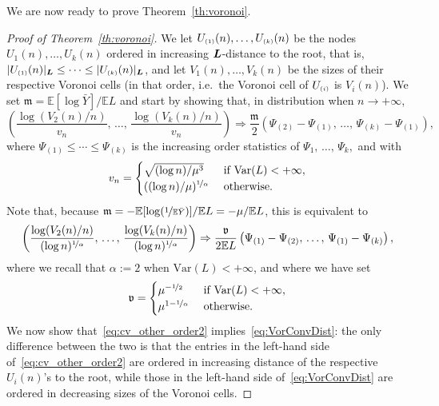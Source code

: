 \documentclass[AHL,Unicode,longabstracts,published]{cedram}
\newcommand{\bs}{\ensuremath{\boldsymbol}}
\newcommand{\sss}{\ensuremath{\scriptscriptstyle}}
\newcommand{\bbE}{\mathbb{E}}
\newcommand{\Var}{\mathrm{Var}}
\newcommand{\frkv}{\mathfrak{v}}
\newcommand{\frkm}{\mathfrak{m}}
\begin{document}
We are now ready to prove Theorem~\ref{th:voronoi}.
\begin{proof}[Proof of Theorem~\ref{th:voronoi}]
We let $U_{\sss (1)}(n), \ldots, U_{\sss (k)}(n)$ be the nodes $U_1(n), \ldots, U_k(n)$ ordered in increasing $\bs L$-distance to the root, that is, $|U_{\sss (1)}(n)|_{\bs L}\leq \cdots\leq |U_{\sss (k)}(n)|_{\bs L}$, and let $V_1(n), \ldots, V_k(n)$ be the sizes of their respective Voronoi cells (in that order, i.e.\ the Voronoi cell of $U_{\sss (i)}$ is $V_i(n)$). We set $\frkm = \bbE[\log \bar Y]/\bbE L$ and start by showing that, in distribution when $n\to+\infty$,
\begin{equation}\label{eq:cv_other_order}
\left(\frac{\log (V_2(n)/n)}{v_n},\,\ldots,\,\frac{\log (V_k(n)/n)}{v_n}\right)
\Rightarrow \frac{\frkm}{2} \left(\Psi_{(2)}-\Psi_{(1)}, \,\ldots,\, \Psi_{(k)}-\Psi_{(1)}\right),
\end{equation}
where $\Psi_{(1)}\leq \cdots\leq \Psi_{(k)}$ is the increasing order statistics of $\Psi_1, \,\ldots,\, \Psi_k,$ and with
\begin{equation}\label{eq:def_vn}
v_n =
\begin{cases}
\sqrt{(\log n)/\mu^3} &\text{ if }\Var(L)<+\infty,\\
((\log n)/\mu)^{\nicefrac1\alpha}&\text{ otherwise}.
\end{cases}
\end{equation}
Note that, because $\frkm = -\bbE[\log(\nicefrac1{\bbE\bar Y})]/\bbE L = -\mu/\bbE L$, this is equivalent to
\begin{equation}\label{eq:cv_other_order2}
\left(\frac{\log (V_2(n)/n)}{(\log n)^{\nicefrac1\alpha}}, \,\ldots,\,\frac{\log (V_k(n)/n)}{(\log n)^{\nicefrac1\alpha}}\right)
\Rightarrow \frac{\frkv}{2\bbE L} \left(\Psi_{(1)}-\Psi_{(2)}, \,\ldots,\, \Psi_{(1)}-\Psi_{(k)}\right),
\end{equation}
where we recall that $\alpha :=2$ when $\Var(L)<+\infty$, and where we have set
\[
\frkv =
\begin{cases}
\mu^{-\nicefrac12} & \text{ if }\Var(L)<+\infty,\\
\mu^{1-\nicefrac1\alpha} &\text{ otherwise.}
\end{cases}
\]
We now show that~\eqref{eq:cv_other_order2} implies~\eqref{eq:VorConvDist}: the only difference between the two is that the entries in the left-hand side of~\eqref{eq:cv_other_order2} are ordered in increasing distance of the respective $U_i(n)$'s to the root, while those in the left-hand side of~\eqref{eq:VorConvDist} are ordered in decreasing sizes of the Voronoi cells.


\end{proof}
\end{document}
